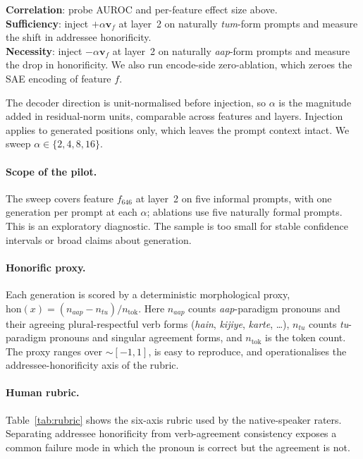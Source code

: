\documentclass[11pt]{article}
\newcommand{\aap}{\textit{aap}}
\newcommand{\tum}{\textit{tum}}
\newcommand{\tu}{\textit{tu}}
\begin{document}
\noindent\textbf{Correlation}: probe AUROC and per-feature effect size above.\\
\textbf{Sufficiency}: inject $+\alpha\mathbf{v}_f$ at layer~2 on naturally
\tum-form prompts and measure the shift in addressee honorificity.\\
\textbf{Necessity}: inject $-\alpha\mathbf{v}_f$ at layer~2 on naturally \aap-form
prompts and measure the drop in honorificity. We also run encode-side
zero-ablation, which zeroes the SAE encoding of feature $f$.

The decoder direction is unit-normalised before injection, so $\alpha$ is the
magnitude added in residual-norm units, comparable across features and layers.
Injection applies to generated positions only, which leaves the prompt context
intact. We sweep $\alpha \in \{2, 4, 8, 16\}$.

\paragraph{Scope of the pilot.} The sweep covers feature $f_{646}$ at layer~2
on five informal prompts, with one generation per prompt at each $\alpha$;
ablations use five naturally formal prompts. This is an exploratory diagnostic.
The sample is too small for stable confidence intervals or broad claims about
generation.

\paragraph{Honorific proxy.}
Each generation is scored by a deterministic morphological proxy,
$\mathrm{hon}(x) = (n_{\aap} - n_{\tu}) / n_{\text{tok}}$. Here $n_{\aap}$
counts \aap-paradigm pronouns and their agreeing plural-respectful verb forms
(\textit{hain}, \textit{kijiye}, \textit{karte}, \ldots), $n_{\tu}$ counts
\tu-paradigm pronouns and singular agreement forms, and $n_{\text{tok}}$ is the
token count. The proxy ranges over ${\sim}[-1,1]$, is easy to reproduce, and
operationalises the addressee-honorificity axis of the rubric.

\paragraph{Human rubric.}
Table~\ref{tab:rubric} shows the six-axis rubric used by the native-speaker
raters. Separating addressee honorificity from verb-agreement consistency
exposes a common failure mode in which the pronoun is correct but the agreement
is not.
\end{document}
